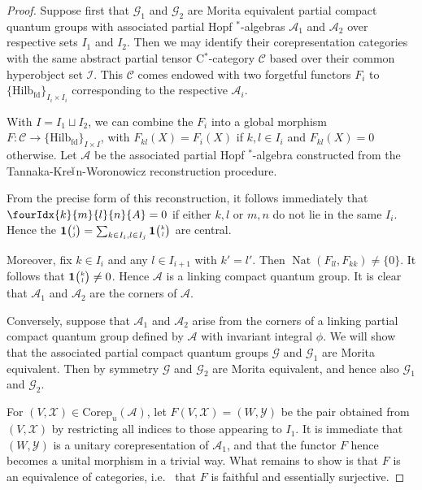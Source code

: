 \documentclass[10pt]{article}
\DeclareMathOperator{\fin}{\mathrm{fd}}
\DeclareMathOperator{\Nat}{\mathrm{Nat}}
\newcommand{\Corep}{\mathrm{Corep}}
\newcommand{\CatCC}{\mathscr{C}}
\newcommand{\Hilb}{\mathrm{Hilb}}
\newcommand{\Grt}[3]{#1{\tiny {\begin{pmatrix} #2\\#3\end{pmatrix}}}}
\newcommand{\UnitC}[2]{\Grt{\mathbf{1}}{#1}{#2}}
\newcommand{\Gr}[5]{\fourIdx{#2}{#4}{#3}{#5}{#1}}%
\theoremstyle{definition}
\numberwithin{equation}{section}
\begin{document}
\begin{proof} Suppose first that $\mathscr{G}_1$ and $\mathscr{G}_2$ are Morita equivalent partial compact quantum groups with associated partial Hopf $^*$-algebras $\mathscr{A}_1$ and $\mathscr{A}_2$ over respective sets $I_1$ and $I_2$. Then we may identify their corepresentation categories with the same abstract partial tensor C$^*$-category $\CatCC$ based over their common hyperobject set $\mathscr{I}$. This $\CatCC$ comes endowed with two forgetful functors $F_i$ to $\{\Hilb_{\fin}\}_{I_i\times I_i}$ corresponding to the respective $\mathscr{A}_i$.

With $I = I_1\sqcup I_2$, we can combine the $F_i$ into a global morphism $F:\CatCC \rightarrow \{\Hilb_{\fin}\}_{I\times I}$, with $F_{kl}(X)=F_i(X)$ if $k,l\in I_i$ and $F_{kl}(X)=0$ otherwise. Let $\mathscr{A}$ be the associated partial Hopf $^*$-algebra constructed from the Tannaka-Kre$\breve{\textrm{\i}}$n-Woronowicz reconstruction procedure. 

From the precise form of this reconstruction, it follows immediately that $\Gr{A}{k}{l}{m}{n} =0$ if either $k,l$ or $m,n$ do not lie in the same $I_i$. Hence the $\UnitC{i}{j} = \sum_{k\in I_i,l\in I_j} \UnitC{k}{l}$ are central. 

Moreover, fix $k\in I_i$ and any $l\in I_{i+1}$ with $k'=l'$. Then $\Nat(F_{ll},F_{kk})\neq \{0\}$. It follows that $\UnitC{k}{l}\neq 0$. Hence $\mathscr{A}$ is a linking compact quantum group. It is clear that $\mathscr{A}_1$ and $\mathscr{A}_2$ are the corners of $\mathscr{A}$. 

Conversely, suppose that $\mathscr{A}_1$ and $\mathscr{A}_2$ arise from the corners of a linking partial compact quantum group defined by $\mathscr{A}$ with invariant integral $\phi$. We will show that the associated partial compact quantum groups $\mathscr{G}$ and $\mathscr{G}_1$ are Morita equivalent. Then by symmetry $\mathscr{G}$ and $\mathscr{G}_2$ are Morita equivalent, and hence also $\mathscr{G}_1$ and $\mathscr{G}_2$.

For $(V,\mathscr{X}) \in \Corep_u(\mathscr{A})$, let $F(V,\mathscr{X}) = (W,\mathscr{Y})$ be the pair obtained from $(V,\mathscr{X})$ by restricting all indices to those appearing to $I_1$. It is immediate that $(W,\mathscr{Y})$ is a unitary corepresentation of $\mathscr{A}_1$, and that the functor $F$ hence becomes a unital morphism in a trivial way. What remains to show is that $F$ is an equivalence of categories, i.e.~ that $F$ is faithful and essentially surjective. 


\end{proof}
\end{document}
